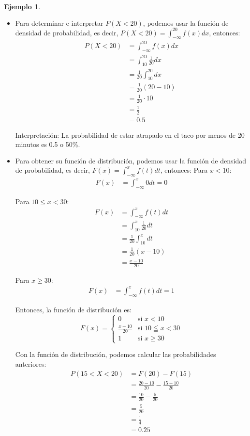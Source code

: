 \documentclass{article}
\theoremstyle{definition}
\newtheorem{example}[definition]{Ejemplo}
\theoremstyle{plain}
\theoremstyle{remark}
\begin{document}
\begin{example}
\begin{itemize}
La probabilidad de estar atrapado en el taco entre 15 y 20 minutos es 0.25 o 25\%.

\item Para determinar e interpretar $P(X < 20)$, podemos usar la función de densidad de probabilidad, es decir, $P(X < 20) = \int_{-\infty}^{20} f(x) dx$, entonces:
\begin{align*}
P(X < 20) &= \int_{-\infty}^{20} f(x) dx \\
&= \int_{10}^{20} \frac{1}{20} dx \\
&= \frac{1}{20} \int_{10}^{20} dx \\
&= \frac{1}{20} (20 - 10) \\
&= \frac{1}{20} \cdot 10 \\
&= \frac{1}{2} \\
&= 0.5
\end{align*}

Interpretación: La probabilidad de estar atrapado en el taco por menos de 20 minutos es 0.5 o 50\%.

\item Para obtener su función de distribución, podemos usar la función de densidad de probabilidad, es decir, $F(x) = \int_{-\infty}^{x} f(t) dt$, entonces:
Para $x < 10$:
\begin{align*}
F(x) &= \int_{-\infty}^{x} 0 dt = 0
\end{align*}

Para $10 \leq x < 30$:
\begin{align*}
F(x) &= \int_{-\infty}^{x} f(t) dt \\
&= \int_{10}^{x} \frac{1}{20} dt \\
&= \frac{1}{20} \int_{10}^{x} dt \\
&= \frac{1}{20} (x - 10) \\
&= \frac{x - 10}{20}
\end{align*}

Para $x \geq 30$:
\begin{align*}
F(x) &= \int_{-\infty}^{x} f(t) dt = 1
\end{align*}

Entonces, la función de distribución es:
\[
F(x) = \begin{cases}
0 & \text{si } x < 10 \\
\frac{x - 10}{20} & \text{si } 10 \leqq x < 30 \\
1 & \text{si } x \geq 30
\end{cases}
\] 

Con la función de distribución, podemos calcular las probabilidades anteriores:
\begin{align*}
P(15 < X < 20) &= F(20) - F(15) \\
&= \frac{20 - 10}{20} - \frac{15 - 10}{20} \\
&= \frac{10}{20} - \frac{5}{20} \\
&= \frac{5}{20} \\
&= \frac{1}{4} \\
&= 0.25
\end{align*}


\end{itemize}
\end{example}
\end{document}
